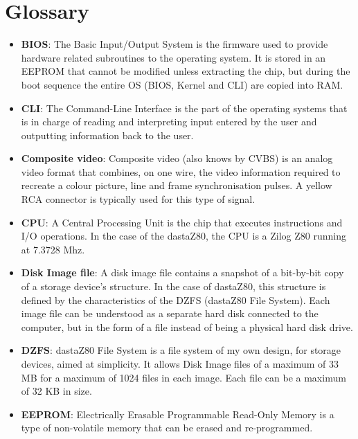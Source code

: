 \section{Glossary}

\begin{itemize}
    \item \textbf{BIOS}: The Basic Input/Output System is the firmware used to
        provide hardware related subroutines to the operating system. It is
        stored in an EEPROM that cannot be modified unless extracting the chip,
        but during the boot sequence the entire OS (BIOS, Kernel and CLI) are
        copied into RAM.
    \item \textbf{CLI}: The Command-Line Interface is the part of the operating
        systems that is in charge of reading and interpreting input entered by
        the user and outputting information back to the user.
    \item \textbf{Composite video}: Composite video (also knows by CVBS) is an
        analog video format that combines, on one wire, the video information
        required to recreate a colour picture, line and frame synchronisation
        pulses. A yellow RCA connector is typically used for this type of signal.
    \item \textbf{CPU}: A Central Processing Unit is the chip that executes
        instructions and I/O operations. In the case of the dastaZ80, the CPU is
        a Zilog Z80 running at 7.3728 Mhz.
    \item \textbf{Disk Image file}: A disk image file contains a snapshot of a
        bit-by-bit copy of a storage device's structure. In the case of dastaZ80,
        this structure is defined by the characteristics of the DZFS (dastaZ80
        File System). Each image file can be understood as a separate hard disk
        connected to the computer, but in the form of a file instead of being a
        physical hard disk drive.
    \item \textbf{DZFS}: dastaZ80 File System is a file system of my own design,
        for storage devices, aimed at simplicity. It allows Disk Image files of
        a maximum of 33 MB for a maximum of 1024 files in each image. Each file
        can be a maximum of 32 KB in size.
    \item \textbf{EEPROM}: Electrically Erasable Programmable Read-Only Memory
        is a type of non-volatile memory that can be erased and re-programmed.

\end{itemize}
